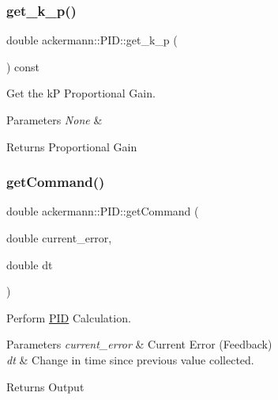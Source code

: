 \subsubsection{\texorpdfstring{get\+\_\+k\+\_\+p()}{get\_k\_p()}}
{\footnotesize\ttfamily double ackermann\+::\+P\+I\+D\+::get\+\_\+k\+\_\+p (\begin{DoxyParamCaption}{ }\end{DoxyParamCaption}) const}



Get the kP Proportional Gain. 


\begin{DoxyParams}{Parameters}
{\em None} & \\
\hline
\end{DoxyParams}
\begin{DoxyReturn}{Returns}
Proportional Gain 
\end{DoxyReturn}
\mbox{\label{classackermann_1_1_p_i_d_a6286415d935d49dceba543deb4356b42}} 
\subsubsection{\texorpdfstring{get\+Command()}{getCommand()}}
{\footnotesize\ttfamily double ackermann\+::\+P\+I\+D\+::get\+Command (\begin{DoxyParamCaption}\item[{double}]{current\+\_\+error,  }\item[{double}]{dt }\end{DoxyParamCaption})}



Perform \hyperlink{classackermann_1_1_p_i_d}{P\+ID} Calculation. 


\begin{DoxyParams}{Parameters}
{\em current\+\_\+error} & Current Error (Feedback) \\
\hline
{\em dt} & Change in time since previous value collected. \\
\hline
\end{DoxyParams}
\begin{DoxyReturn}{Returns}
Output 
\end{DoxyReturn}
\mbox{\label{classackermann_1_1_p_i_d_a1f2e47eb9958ec5d1887bf7c5f82175a}} 
